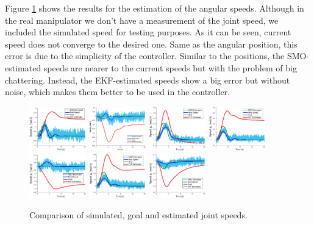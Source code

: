 \documentclass[conference,letterpaper]{ieeeconf}
\begin{document}
Figure \ref{fig:result_qp} shows the results for the estimation of the angular speeds. Although in the real manipulator we don't have a measurement of the joint speed, we included the simulated speed for testing purposes. As it can be seen, current speed does not converge to the desired one. Same as the angular position, this error is due to the simplicity of the controller. Similar to the positions, the SMO-estimated speeds are nearer to the current speeds but with the problem of big chattering. Instead, the EKF-estimated speeds show a big error but without noise, which makes them better to be used in the controller. 
\begin{figure}
  \centering
  \includegraphics[width=0.22\textwidth]{Figures/result_qp1.eps}
  \includegraphics[width=0.22\textwidth]{Figures/result_qp2.eps}
  \includegraphics[width=0.22\textwidth]{Figures/result_qp3.eps}
  \includegraphics[width=0.22\textwidth]{Figures/result_qp4.eps}
  \includegraphics[width=0.22\textwidth]{Figures/result_qp5.eps}
  \includegraphics[width=0.22\textwidth]{Figures/result_qp6.eps}
  \includegraphics[width=0.22\textwidth]{Figures/result_qp7.eps}
  \caption{Comparison of simulated, goal and estimated joint speeds.}
  \label{fig:result_qp}
\end{figure}
\end{document}
